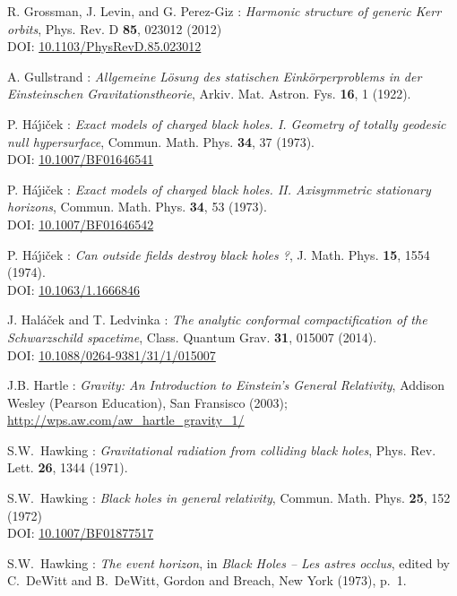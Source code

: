 \begin{thebibliography}{123}
R. Grossman, J. Levin, and G. Perez-Giz :
{\em Harmonic structure of generic Kerr orbits},
Phys. Rev. D {\bf 85}, 023012 (2012)\\
DOI: \href{https://doi.org/10.1103/PhysRevD.85.023012}{10.1103/PhysRevD.85.023012}

A. Gullstrand :  \emph{Allgemeine Lösung des statischen Einkörperproblems in der Einsteinschen Gravitationstheorie},
Arkiv. Mat. Astron. Fys. {\bf 16}, 1 (1922).

P. H\'a\'\j i\v{c}ek : {\em Exact models of charged black holes. I. Geometry
of totally geodesic null hypersurface},
Commun. Math. Phys. {\bf 34}, 37 (1973). \\
DOI: \href{https://doi.org/10.1007/BF01646541}{10.1007/BF01646541}

P. H\'a\'\j i\v{c}ek : {\em Exact models of charged black holes.
II. Axisymmetric stationary horizons},
Commun. Math. Phys. {\bf 34}, 53 (1973). \\
DOI: \href{https://doi.org/10.1007/BF01646542}{10.1007/BF01646542}

P. H\'a\'\j i\v{c}ek : {\em Can outside fields destroy black holes ?},
J. Math. Phys. {\bf 15}, 1554 (1974). \\
DOI: \href{https://doi.org/10.1063/1.1666846}{10.1063/1.1666846}

J. Hal\'a\v{c}ek and T. Ledvinka :
{\em The analytic conformal compactification of the Schwarzschild spacetime},
Class. Quantum Grav. {\bf 31}, 015007 (2014).\\
DOI: \href{https://doi.org/10.1088/0264-9381/31/1/015007}{10.1088/0264-9381/31/1/015007}

J.B. Hartle : \emph{Gravity: An Introduction to Einstein's General Relativity},
Addison Wesley (Pearson Education), San Fransisco (2003); \\
\url{http://wps.aw.com/aw_hartle_gravity_1/}

S.W.~Hawking : {\em Gravitational radiation from colliding black holes},
Phys. Rev. Lett. {\bf 26}, 1344 (1971).

S.W.~Hawking : {\em Black holes in general relativity},
Commun. Math. Phys. {\bf 25}, 152 (1972)\\
DOI: \href{https://doi.org/10.1007/BF01877517}{10.1007/BF01877517}

S.W.~Hawking : {\em The event horizon},
in {\em Black Holes -- Les astres occlus}, edited by C.~DeWitt and B.~DeWitt,
Gordon and Breach, New York (1973), p.~1.


\end{thebibliography}
